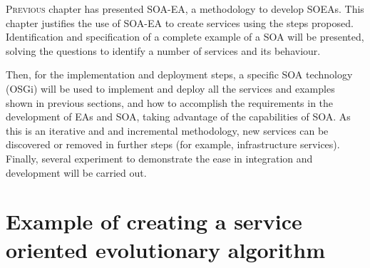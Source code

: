 \label{chap:osgiliath}


\minitoc\mtcskip
\vfill


\lettrine{P}{revious} chapter has presented SOA-EA, a methodology to develop SOEAs. This chapter justifies the use of SOA-EA to create services using the steps proposed. Identification and specification of a complete example of a SOA will be presented, solving the questions to identify a number of services and its behaviour.

Then, for the implementation and deployment steps, a specific SOA technology (OSGi) will be used to implement and deploy all the services and examples shown in previous sections, and how to accomplish the requirements in the development of EAs and SOA, taking advantage of the capabilities of SOA. As this is an iterative and and incremental methodology, new services can be discovered or removed in further steps (for example, infrastructure services). Finally, several experiment to demonstrate the ease in integration and development will be carried out.

\section{Example of creating a service oriented evolutionary algorithm}
\label{sec:soaea:creating}
 
